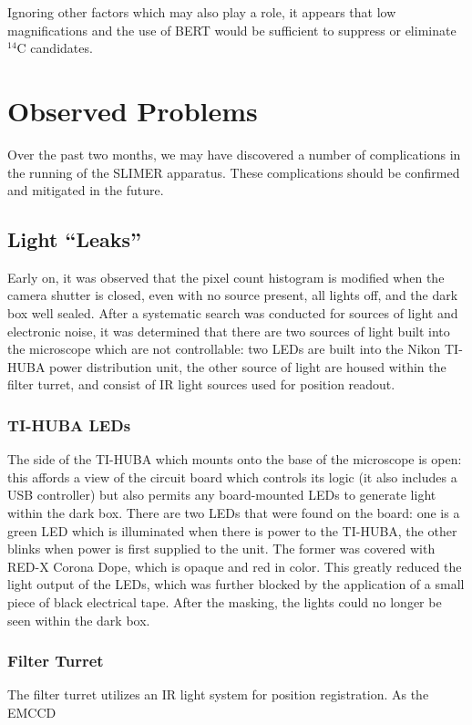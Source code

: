 \documentclass[11pt]{article}
\newcommand{\nuc}[2]{\ensuremath{^{#1}}#2}
\begin{document}
Ignoring other factors which may also play a role, it appears that low magnifications and the use of BERT would be sufficient to suppress or eliminate \nuc{14}{C} candidates.    


      
 
  
\section{Observed Problems}
Over the past two months, we may have discovered a number of complications in the running of the SLIMER apparatus. These complications should be confirmed and mitigated in the future.

\subsection{Light ``Leaks''}
Early on, it was observed that the pixel count histogram is modified when the camera shutter is closed, even with no source present, all lights off, and the dark box well sealed. After a systematic 
search was conducted for sources of light and electronic noise, it was determined that there are two sources of light built into the microscope which are not controllable: two LEDs are built into the Nikon TI-HUBA power distribution unit, the other source of light are housed within the filter turret, and consist of IR light sources used for position readout. 

\subsubsection{TI-HUBA LEDs}
The side of the TI-HUBA which mounts onto the base of the microscope is open: this affords a view of the circuit board which controls its logic (it also includes a USB controller) but also permits any board-mounted LEDs to generate light within the dark box. There are two LEDs that were found on the board: one is a green LED which is illuminated when there is power to the TI-HUBA, the other blinks when power is first supplied to the unit. The former was covered with RED-X Corona Dope, which is opaque and red in color. This greatly reduced the light output of the LEDs, which was further blocked by the application of a small piece of black electrical tape.  After the masking, the lights could no longer be seen within the dark box. 

\subsubsection{Filter Turret}
The filter turret utilizes an IR light system for position registration. As the EMCCD 
\end{document}
